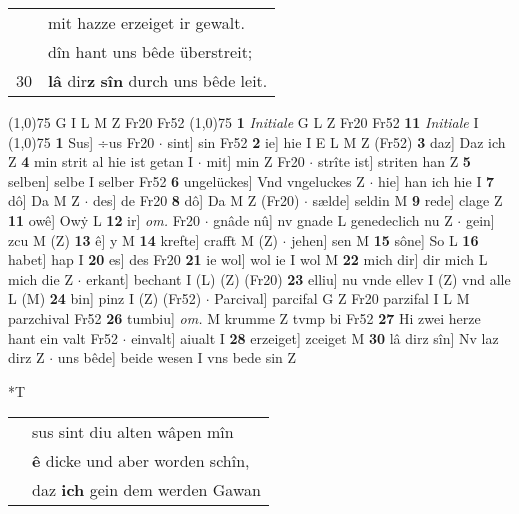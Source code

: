 \documentclass[8pt,a4paper,notitlepage]{article}
\begin{document}
\begin{table}[ht]
\begin{minipage}[t]{0.5\linewidth}
\begin{tabular}{rl}
 & mit hazze erzeiget ir gewalt.\\ 
 & dîn hant uns bêde überstreit;\\ 
30 & \textbf{lâ} dir\textbf{z} \textbf{sîn} durch uns bêde leit.\\ 
\end{tabular}
\scriptsize
\line(1,0){75} \newline
G I L M Z Fr20 Fr52 \newline
\line(1,0){75} \newline
\textbf{1} \textit{Initiale} G L Z Fr20 Fr52  \textbf{11} \textit{Initiale} I  \newline
\line(1,0){75} \newline
\textbf{1} Sus] ÷us Fr20  $\cdot$ sint] sin Fr52 \textbf{2} ie] hie I E L M Z (Fr52) \textbf{3} daz] Daz ich Z \textbf{4} min strit al hie ist getan I  $\cdot$ mit] min Z Fr20  $\cdot$ strîte ist] striten han Z \textbf{5} selben] selbe I selber Fr52 \textbf{6} ungelückes] Vnd vngeluckes Z  $\cdot$ hie] han ich hie I \textbf{7} dô] Da M Z  $\cdot$ des] de Fr20 \textbf{8} dô] Da M Z (Fr20)  $\cdot$ sælde] seldin M \textbf{9} rede] clage Z \textbf{11} owê] Owẏ L \textbf{12} ir] \textit{om.} Fr20  $\cdot$ gnâde nû] nv gnade L genedeclich nu Z  $\cdot$ gein] zcu M (Z) \textbf{13} ê] y M \textbf{14} krefte] crafft M (Z)  $\cdot$ jehen] sen M \textbf{15} sône] So L \textbf{16} habet] hap I \textbf{20} es] des Fr20 \textbf{21} ie wol] wol ie I wol M \textbf{22} mich dir] dir mich L mich die Z  $\cdot$ erkant] bechant I (L) (Z) (Fr20) \textbf{23} elliu] nu vnde ellev I (Z) vnd alle L (M) \textbf{24} bin] pinz I (Z) (Fr52)  $\cdot$ Parcival] parcifal G Z Fr20 parzifal I L M parzchival Fr52 \textbf{26} tumbiu] \textit{om.} M krumme Z tvmp bi Fr52 \textbf{27} Hi zwei herze hant ein valt Fr52  $\cdot$ einvalt] aiualt I \textbf{28} erzeiget] zceiget M \textbf{30} lâ dirz sîn] Nv laz dirz Z  $\cdot$ uns bêde] beide wesen I vns bede sin Z \newline
\end{minipage}
\hspace{0.5cm}
\begin{minipage}[t]{0.5\linewidth}
\small
\begin{center}*T
\end{center}
\begin{tabular}{rl}
 & sus sint diu alten wâpen mîn\\ 
 & \textbf{ê} dicke und aber worden schîn,\\ 
 & daz \textbf{ich} gein dem werden Gawan\\ 

\end{tabular}
\end{minipage}
\end{table}
\end{document}
